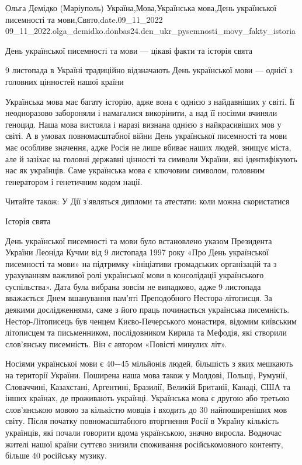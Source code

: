  
 
 
 
 

Ольга Демідко (Маріуполь)
Україна,Мова,Українська мова,День української писемності та мови,Свято,date.09_11_2022
09_11_2022.olga_demidko.donbas24.den_ukr_pysemnosti_movy_fakty_istoria

День української писемності та мови — цікаві факти та історія свята

9 листопада в Україні традиційно відзначають День української мови — однієї з
головних цінностей нашої країни

Українська мова має багату історію, адже вона є однією з найдавніших у світі.
Її неодноразово забороняли і намагалися викорінити, а над її носіями вчиняли
геноцид. Наша мова вистояла і наразі визнана однією з найкрасивіших мов у
світі. А в умовах повномасштабної війни День української писемності та мови має
особливе значення, адже Росія не лише вбиває наших людей, знищує міста, але й
зазіхає на головні державні цінності та символи України, які ідентифікують нас
як українців. Саме українська мова є ключовим символом, головним генератором і
генетичним кодом нації.

Читайте також: У Дії з’являться дипломи та атестати: коли можна скористатися

Історія свята

День української писемності та мови було встановлено указом Президента України
Леоніда Кучми від 9 листопада 1997 року «Про День української писемності та
мови» на підтримку «ініціативи громадських організацій та з урахуванням
важливої ролі української мови в консолідації українського суспільства». Дата
була вибрана зовсім не випадково, адже 9 листопада вважається Днем вшанування
пам’яті Преподобного Нестора-літописця. За деякими дослідженнями, саме з його
праць починається українська писемність. Нестор-Літописець був ченцем
Києво-Печерського монастиря, відомим київським літописцем та письменником,
послідовником Кирила та Мефодія, які створили слов’янську писемність. Він є
автором «Повісті минулих літ».

Носіями української мови є 40−45 мільйонів людей, більшість з яких мешкають на
території України. Поширена наша мова також у Молдові, Польщі, Румунії,
Словаччині, Казахстані, Аргентині, Бразилії, Великій Британії, Канаді, США та
інших країнах, де проживають українці. Українська мова є другою або третьою
слов’янською мовою за кількістю мовців і входить до 30 найпоширеніших мов
світу. Після початку повномасштабного вторгнення Росії в Україну кількість
українців, які почали говорити вдома українською, значно виросла. Водночас
жителі нашої країни суттєво знизили споживання російськомовного контенту,
більше 40%
російську музику.


